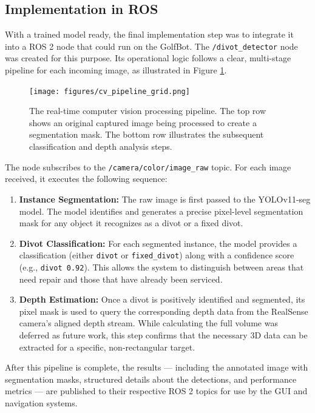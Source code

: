 \subsection{Implementation in ROS}
\label{ssec:cv_ros_implementation}
With a trained model ready, the final implementation step was to integrate it into a ROS 2 node that could run on the GolfBot. The \texttt{/divot\_detector} node was created for this purpose. Its operational logic follows a clear, multi-stage pipeline for each incoming image, as illustrated in Figure \ref{fig:cv_processing_pipeline}.

\begin{figure}[h!]
    \centering
    \texttt{[image: figures/cv\_pipeline\_grid.png]}
    \caption{The real-time computer vision processing pipeline. The top row shows an original captured image being processed to create a segmentation mask. The bottom row illustrates the subsequent classification and depth analysis steps.}
    \label{fig:cv_processing_pipeline}
\end{figure}

The node subscribes to the \texttt{/camera/color/image\_raw} topic. For each image received, it executes the following sequence:

\begin{enumerate}
    \item \textbf{Instance Segmentation:} The raw image is first passed to the YOLOv11-seg model. The model identifies and generates a precise pixel-level segmentation mask for any object it recognizes as a divot or a fixed divot.

    \item \textbf{Divot Classification:} For each segmented instance, the model provides a classification (either \texttt{divot} or \texttt{fixed\_divot}) along with a confidence score (e.g., \texttt{divot 0.92}). This allows the system to distinguish between areas that need repair and those that have already been serviced.

    \item \textbf{Depth Estimation:} Once a divot is positively identified and segmented, its pixel mask is used to query the corresponding depth data from the RealSense camera's aligned depth stream. While calculating the full volume was deferred as future work, this step confirms that the necessary 3D data can be extracted for a specific, non-rectangular target.
\end{enumerate}

After this pipeline is complete, the results — including the annotated image with segmentation masks, structured details about the detections, and performance metrics — are published to their respective ROS 2 topics for use by the GUI and navigation systems.



